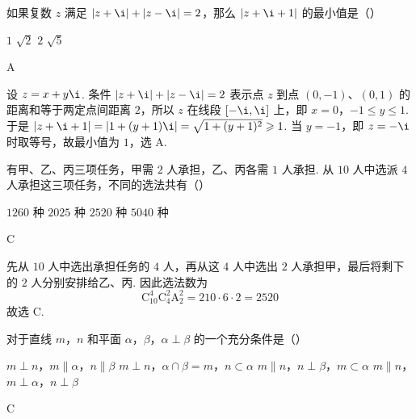 \documentclass[UTF8,a4paper,oneside,11pt]{ctexbook}
\begin{document}
\begin{problem}
如果复数 \(z\) 满足 \(|z + \i| + |z - \i| = 2\)，那么 \(|z + \i + 1|\) 的最小值是（\quad）

\choices
    {\(1\)}
    {\(\sqrt{2}\)}
    {\(2\)}
    {\(\sqrt{5}\)}
\end{problem}

\begin{answer}
A
\end{answer}

\begin{solution}
设 \(z=x+y\i\). 条件 \(|z+\i|+|z-\i|=2\) 表示点 \(z\) 到点 \((0,-1)\)、\((0,1)\) 的距离和等于两定点间距离 \(2\)，所以 \(z\) 在线段 \([-\i,\i]\) 上，即 \(x=0\)，\(-1\leqslant y\leqslant1\). 于是 \(|z+\i+1|=|1+(y+1)\i|=\sqrt{1+(y+1)^2}\geqslant1\).
当 \(y=-1\)，即 \(z=-\i\) 时取等号，故最小值为 \(1\)，选 A.
\end{solution}

\begin{problem}
有甲、乙、丙三项任务，甲需 \(2\) 人承担，乙、丙各需 \(1\) 人承担. 从 \(10\) 人中选派 \(4\) 人承担这三项任务，不同的选法共有（\quad）

\choices
    {\(1260\) 种}
    {\(2025\) 种}
    {\(2520\) 种}
    {\(5040\) 种}
\end{problem}

\begin{answer}
C
\end{answer}

\begin{solution}
先从 \(10\) 人中选出承担任务的 \(4\) 人，再从这 \(4\) 人中选出 \(2\) 人承担甲，最后将剩下的 \(2\) 人分别安排给乙、丙. 因此选法数为
\[
\mathrm C_{10}^{4}\mathrm C_{4}^{2}\mathrm A_{2}^{2}=210\cdot6\cdot2=2520
\]
故选 C.
\end{solution}

\begin{problem}
对于直线 \(m\)，\(n\) 和平面 \(\alpha\)，\(\beta\)，\(\alpha \perp \beta\) 的一个充分条件是（\quad）

\choices
    {\(m \perp n\)，\(m \parallel \alpha\)，\(n \parallel \beta\)}
    {\(m \perp n\)，\(\alpha \cap \beta = m\)，\(n \subset \alpha\)}
    {\(m \parallel n\)，\(n \perp \beta\)，\(m \subset \alpha\)}
    {\(m \parallel n\)，\(m \perp \alpha\)，\(n \perp \beta\)}
\end{problem}

\begin{answer}
C
\end{answer}
\end{document}
